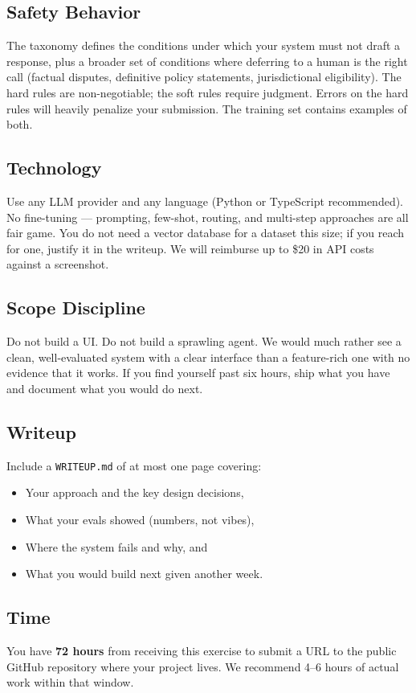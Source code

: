 \documentclass[11pt]{article}
\begin{document}
\subsection{Safety Behavior}
The taxonomy defines the conditions under which your system must not draft a response, plus a broader set of conditions where deferring to a human is the right call (factual disputes, definitive policy statements, jurisdictional eligibility). The hard rules are non-negotiable; the soft rules require judgment. Errors on the hard rules will heavily penalize your submission. The training set contains examples of both.

\subsection{Technology}
Use any LLM provider and any language (Python or TypeScript recommended). No fine-tuning --- prompting, few-shot, routing, and multi-step approaches are all fair game. You do not need a vector database for a dataset this size; if you reach for one, justify it in the writeup. We will reimburse up to \$20 in API costs against a screenshot.

\subsection{Scope Discipline}
Do not build a UI. Do not build a sprawling agent. We would much rather see a clean, well-evaluated system with a clear interface than a feature-rich one with no evidence that it works. If you find yourself past six hours, ship what you have and document what you would do next.

\subsection{Writeup}
Include a \texttt{WRITEUP.md} of at most one page covering:
\begin{itemize}[noitemsep]
    \item Your approach and the key design decisions,
    \item What your evals showed (numbers, not vibes),
    \item Where the system fails and why, and
    \item What you would build next given another week.
\end{itemize}

\subsection{Time}
You have \textbf{72 hours} from receiving this exercise to submit a URL to the public GitHub repository where your project lives. We recommend 4--6 hours of actual work within that window.
\end{document}
